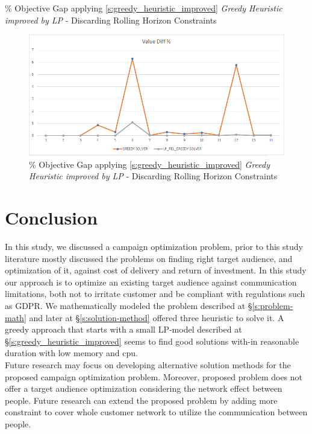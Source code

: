 \documentclass[11pt]{article}
\begin{document}
{\begin{landscape}
        \begin{table}[htb]
                \centering
                \caption[Short Caption for LoT]{\% Objective Gap applying \ref{s:greedy_heuristic_improved} \textit{Greedy Heuristic improved by LP} - Discarding Rolling Horizon Constraints}\label{table:tbl_test_obj_diff_bett_no_rh}
        \end{table}
        \begin{figure}[htp]
            \centering
            \includegraphics[width=12cm]{value_diff_bett_no_rh}
            \caption{\% Objective Gap applying \ref{s:greedy_heuristic_improved} \textit{Greedy Heuristic improved by LP} - Discarding Rolling Horizon Constraints}
            \label{fig:fig_value_diff_bett_no_rh}
        \end{figure}
    \end{landscape}
    \clearpage%
}


\newpage

\section{Conclusion} \label{s:conclusion}
In this study, we discussed a campaign optimization problem, prior to this study literature mostly discussed the problems on finding right target audience, and optimization of it, against cost of delivery and return of investment. In this study our approach is to optimize an existing target audience against communication limitations, both not to irritate customer and be compliant with regulations such as GDPR. We mathematically modeled the problem described at \S \ref{s:problem-math} and later at \S \ref{s:solution-method} offered three heuristic to solve it. A greedy approach that starts with a small LP-model described at \S \ref{s:greedy_heuristic_improved} seems to find good solutions with-in reasonable duration with low memory and cpu.\\
Future research may focus on developing alternative solution methods for the proposed campaign optimization problem. Moreover, proposed problem does not offer a target audience optimization considering the network effect between people. Future research can extend the proposed problem by adding more constraint to cover whole customer network to utilize the communication between people.

\newpage



\end{document}
